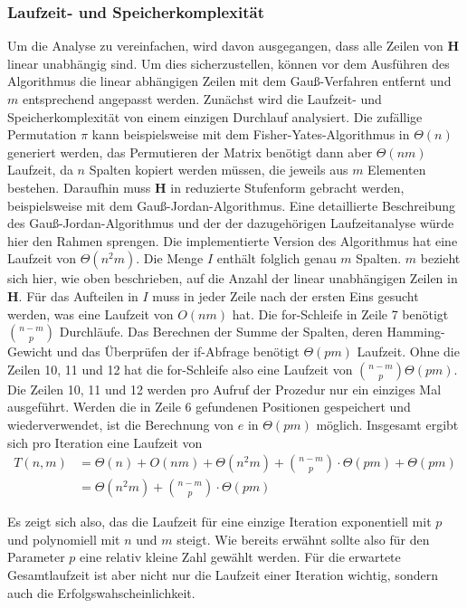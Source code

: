 \documentclass[a4paper,10pt,ngerman]{scrartcl}
\begin{document}
\subsubsection{Laufzeit- und Speicherkomplexität}
\label{sec:runtime}
Um die Analyse zu vereinfachen, wird davon ausgegangen, dass alle Zeilen von $\mathbf{H}$ linear unabhängig sind. 
Um dies sicherzustellen, können vor dem Ausführen des Algorithmus die linear abhängigen Zeilen mit dem Gauß-Verfahren entfernt und $m$ entsprechend angepasst werden. 
Zunächst wird die Laufzeit- und Speicherkomplexität von einem einzigen Durchlauf analysiert. 
Die zufällige Permutation $\pi$ kann beispielsweise mit dem Fisher-Yates-Algorithmus in $\Theta(n)$ generiert werden, das Permutieren der Matrix benötigt dann aber $\Theta(nm)$ Laufzeit, da $n$ Spalten kopiert werden müssen, die jeweils aus $m$ Elementen bestehen.
Daraufhin muss $\mathbf{H}$ in reduzierte Stufenform gebracht werden, beispielsweise mit dem Gauß-Jordan-Algorithmus. 
Eine detaillierte Beschreibung des Gauß-Jordan-Algorithmus und der der dazugehörigen Laufzeitanalyse würde hier den Rahmen sprengen.
Die implementierte Version des Algorithmus hat eine Laufzeit von $\Theta(n^2m)$.
Die Menge $I$ enthält folglich genau $m$ Spalten.
$m$ bezieht sich hier, wie oben beschrieben, auf die Anzahl der linear unabhängigen Zeilen in $\mathbf{H}$.
Für das Aufteilen in $I$ muss in jeder Zeile nach der ersten Eins gesucht werden, was eine Laufzeit von $O(nm)$ hat.
Die for-Schleife in Zeile 7 benötigt $\binom{n-m}{p}$ Durchläufe.
Das Berechnen der Summe der Spalten, deren Hamming-Gewicht und das Überprüfen der if-Abfrage benötigt $\Theta(pm)$ Laufzeit. 
Ohne die Zeilen 10, 11 und 12 hat die for-Schleife also eine Laufzeit von $\binom{n-m}{p}\Theta(pm)$.
Die Zeilen 10, 11 und 12 werden pro Aufruf der Prozedur nur ein einziges Mal ausgeführt. Werden die in Zeile 6 gefundenen Positionen gespeichert und wiederverwendet, ist die Berechnung von $e$ in $\Theta(pm)$ möglich. 
Insgesamt ergibt sich pro Iteration eine Laufzeit von 
\begin{align*}
    T(n, m) &= \Theta(n) + O(nm) + \Theta(n^2m) + \binom{n-m}{p} \cdot \Theta(pm) + \Theta(pm)\\
            &= \Theta(n^2m) + \binom{n-m}{p}\cdot \Theta(pm)
\end{align*}

Es zeigt sich also, das die Laufzeit für eine einzige Iteration exponentiell mit $p$ und polynomiell mit $n$ und $m$ steigt. Wie bereits erwähnt sollte also für den Parameter $p$ eine relativ kleine Zahl gewählt werden.
Für die erwartete Gesamtlaufzeit ist aber nicht nur die Laufzeit einer Iteration wichtig, sondern auch die Erfolgswahscheinlichkeit.
\end{document}
